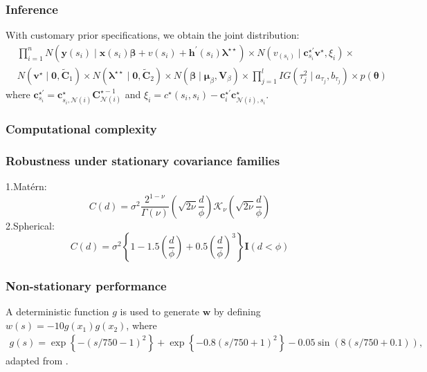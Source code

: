 \documentclass[
12pt, %
a4paper, %
oneside, %
headinclude,footinclude, %
BCOR5mm, %
]{scrartcl}
\begin{document}
\subsubsection{Inference}
With customary prior specifications, we obtain the joint distribution:%
\begin{equation}
\begin{aligned}
& \prod_{i=1}^{n} N\left(\mathbf{y}\left({s}_{i}\right) \mid \mathbf{x}\left({s}_{i}\right) \boldsymbol{\beta}+
v\left(s_i\right) + \mathbf{h}^\prime(s_i)\boldsymbol{\lambda}^{\star\star}\right) \times N\left(v_{(s_i)} \mid \mathbf{c}_{s_i}^{\star\prime}\mathbf{v}^{\star}, \xi_{i}\right) \times \\ &
N\left(\mathbf{v}^{\star} \mid \boldsymbol{0}, {\tilde{\mathbf{C}}_1}\right) \times N\left(\boldsymbol{\lambda}^{\star\star} \mid \boldsymbol{0}, \tilde{\mathbf{C}}_2\right) \times N\left(\boldsymbol{\beta} \mid \boldsymbol{\mu}_{\beta}, \mathbf{V}_{\beta}\right) \times  \prod_{j=1}^{l} I G\left(\tau_{j}^{2} \mid a_{\tau_{j}}, b_{\tau_{j}}\right) \times p(\boldsymbol{\theta})
\end{aligned}
\end{equation}
where  $\mathbf{c}_{s_i}^{\star\prime} = \mathbf{c}_{s_i, \mathcal{N}(i)}^{\star}\boldsymbol{C}_{ \mathcal{N}(i)}^{\star -1}$ and $\xi_{i} = c^{\star}(s_i, s_i) - \mathbf{c}_{i}^{\star\prime} \mathbf{c}_{\mathcal{N}(i), s_i}^{\star}$.

\subsubsection{Computational complexity}


\subsubsection{ Robustness under stationary covariance families}
1.Matérn:
$$C(d) = \sigma^2 \frac{2^{1 - \nu}}{\Gamma(\nu)}\left(\sqrt{2\nu}\frac{d}{\phi}\right)\mathcal{K}_{\nu}\left(\sqrt{2\nu}\frac{d}{\phi}\right)$$
2.Spherical:
$$C(d) = \sigma^2\left\{1 - 1.5\left(\frac{d}{\phi}\right) + 0.5\left(\frac{d}{\phi}\right)^3\right\}\mathbf{I}(d < \phi)$$


\subsubsection{Non-stationary performance}
A deterministic function $g$ is used to generate $\boldsymbol{w}$ by defining $w(s) = -10g(x_1)g(x_2)$, where 
\begin{equation}
\begin{aligned}
  g(s) = \exp\left\{-\left(s/750 - 1\right)^2\right\} + \exp\left\{-0.8\left(s/750 + 1\right)^2\right\} - 0.05\sin\left(8(s/750 + 0.1)\right),
\end{aligned} \label{DP1}
\end{equation}
adapted from \citep{guhaniyogi2017divide}.
\end{document}
